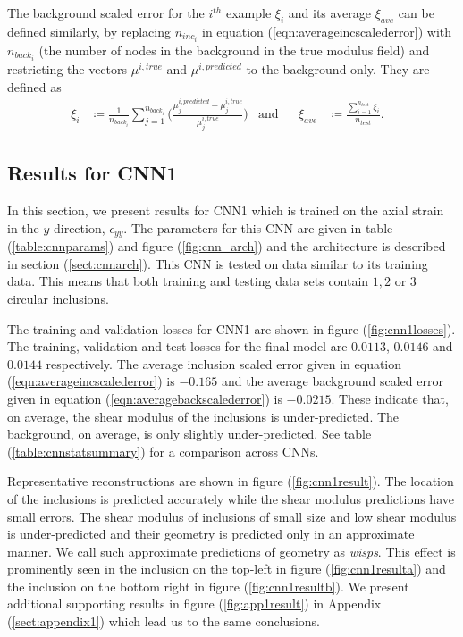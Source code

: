 \documentclass[12pt]{article}
\begin{document}
The background scaled error for the $i^{th}$ example $\xi_{i}$ and its average $\xi_{ave}$ can be defined similarly, by replacing $n_{inc_i}$ in equation (\ref{eqn:averageincscalederror})  with $n_{back_i}$ (the number of nodes in the background in the true modulus field) and restricting the vectors $\mu^{i,true}$ and $\mu^{i,predicted}$ to the background only. They are defined as 
  \begin{align}
  \xi_{i} &\coloneqq \frac{1}{n_{back_i}}\sum_{j=1}^{n_{back_i}}{\Bigg (}\frac{\mu^{i,predicted}_{j}-\mu^{i,true}_{j}}{\mu^{i,true}_{j}}{\Bigg )} &\text{and} && \xi_{ave} &\coloneqq \frac{\sum_{i=1}^{n_{test}}\xi_{i}}{n_{test}}. &\label{eqn:averagebackscalederror}
  \end{align}

%
\subsection{\label{sect:resultscnn1}Results for CNN1}
%
In this section, we present results for CNN1 which is trained on the axial strain in the $y$ direction, $\epsilon_{yy}$. The parameters for this CNN are given in table (\ref{table:cnnparams}) and figure (\ref{fig:cnn_arch}) and the architecture is described in section (\ref{sect:cnnarch}). This CNN is tested on data similar to its training data. This means that both training and testing data sets contain $1,2$ or $3$ circular inclusions.

The training and validation losses for CNN1 are shown in figure (\ref{fig:cnn1losses}). The training, validation and test losses for the final model are $0.0113$, $0.0146$ and $0.0144$ respectively. The average inclusion scaled error given in equation (\ref{eqn:averageincscalederror}) is $-0.165$ and the average background scaled error given in equation (\ref{eqn:averagebackscalederror}) is $-0.0215$. These indicate that, on average, the shear modulus of the inclusions is under-predicted. The background, on average, is only slightly under-predicted. See table (\ref{table:cnnstatsummary}) for a comparison across CNNs.

Representative reconstructions are shown in figure (\ref{fig:cnn1result}). The location of the inclusions is predicted accurately while the shear modulus predictions have small errors. The shear modulus of inclusions of small size and low shear modulus is under-predicted and their geometry is predicted only in an approximate manner. We call such approximate predictions of geometry as \textit{wisps}. This effect is prominently seen in the inclusion on the top-left in figure (\ref{fig:cnn1resulta}) and the inclusion on the bottom right in figure (\ref{fig:cnn1resultb}). We present additional supporting results in figure (\ref{fig:app1result}) in Appendix (\ref{sect:appendix1}) which lead us to the same conclusions.
\end{document}
